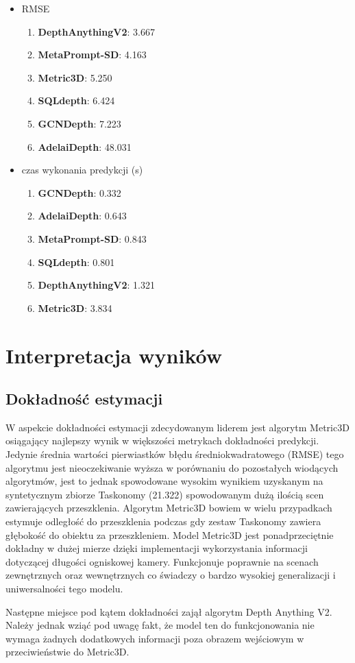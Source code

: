\begin{itemize}
    \item RMSE
    \begin{enumerate}
        \item \textbf{DepthAnythingV2}: 3.667
        \item \textbf{MetaPrompt-SD}: 4.163
        \item \textbf{Metric3D}: 5.250
        \item \textbf{SQLdepth}: 6.424
        \item \textbf{GCNDepth}: 7.223
        \item \textbf{AdelaiDepth}: 48.031
    \end{enumerate}

    \item czas wykonania predykcji (s)
    \begin{enumerate}
        \item \textbf{GCNDepth}: 0.332
        \item \textbf{AdelaiDepth}: 0.643
        \item \textbf{MetaPrompt-SD}: 0.843
        \item \textbf{SQLdepth}: 0.801
        \item \textbf{DepthAnythingV2}: 1.321
        \item \textbf{Metric3D}: 3.834
    \end{enumerate}
\end{itemize}

\section{Interpretacja wyników}
\subsection{Dokładność estymacji}
W aspekcie dokładności estymacji zdecydowanym liderem jest algorytm Metric3D osiągający najlepszy wynik w większości metrykach dokładności predykcji. Jedynie średnia wartości pierwiastków błędu średniokwadratowego (RMSE) tego algorytmu jest nieoczekiwanie wyższa w porównaniu do pozostałych wiodących algorytmów, jest to jednak spowodowane wysokim wynikiem uzyskanym na syntetycznym zbiorze Taskonomy (21.322) spowodowanym dużą ilością scen zawierających przeszklenia. Algorytm Metric3D bowiem w wielu przypadkach estymuje odległość do przeszklenia podczas gdy zestaw Taskonomy zawiera głębokość do obiektu za przeszkleniem. Model Metric3D jest ponadprzeciętnie dokładny w dużej mierze dzięki implementacji wykorzystania informacji dotyczącej długości ogniskowej kamery. Funkcjonuje poprawnie na scenach zewnętrznych oraz wewnętrznych co świadczy o bardzo wysokiej generalizacji i uniwersalności tego modelu.

Następne miejsce pod kątem dokładności zajął algorytm Depth Anything V2. Należy jednak wziąć pod uwagę fakt, że model ten do funkcjonowania nie wymaga żadnych dodatkowych informacji poza obrazem wejściowym w przeciwieństwie do Metric3D.
